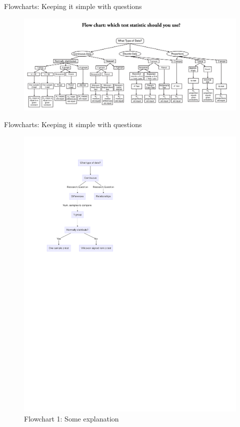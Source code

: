 \documentclass[
  ignorenonframetext,
]{beamer}
\begin{document}
\begin{frame}{Flowcharts: Keeping it simple with questions}
\label{flowcharts-keeping-it-simple-with-questions-1}
\begin{figure}

{\centering \includegraphics[width=1\linewidth]{fig/which_test_flowchart} 

}

\end{figure}
\end{frame}

\begin{frame}{Flowcharts: Keeping it simple with questions}
\label{flowcharts-keeping-it-simple-with-questions-2}
\begin{figure}

{\centering \includegraphics{Inferential-Stat-and-Z-test_files/figure-beamer/figure_1-1} 

}

\caption{Flowchart 1: Some explanation}\label{fig:figure_1}
\end{figure}
\end{frame}
\end{document}
